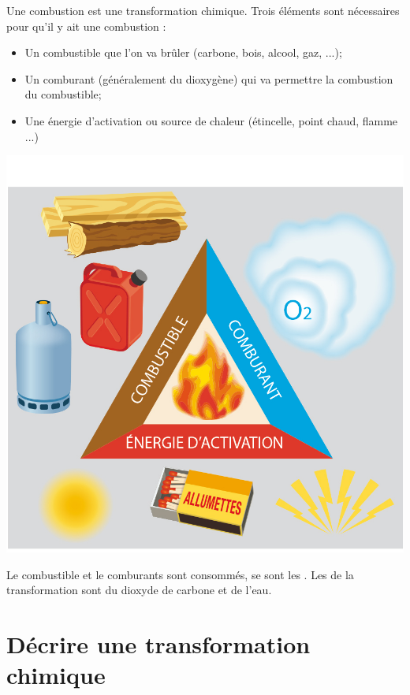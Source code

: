 \documentclass[12pt,a4paper]{article}
\begin{document}
\begin{myex}
	Une combustion est une transformation chimique.
	Trois éléments sont nécessaires pour qu'il y ait une combustion :
	\begin{multicols}{2}
		\begin{itemize}
			\item Un combustible que l'on va brûler (carbone, bois, alcool, gaz, ...);
			\item Un comburant (généralement du dioxygène) qui va permettre la combustion du combustible;
			\item Une énergie d'activation ou source de chaleur (étincelle, point chaud, flamme ...)
		\end{itemize}
	
		\begin{center}
			\includegraphics[scale=0.15]{img/triangle}
		\end{center}
	\end{multicols}

	Le combustible et le comburants sont consommés, se sont les . 
	Les  de la transformation sont du dioxyde de carbone et de l'eau.


\end{myex}

\section{Décrire une transformation chimique}
\end{document}

